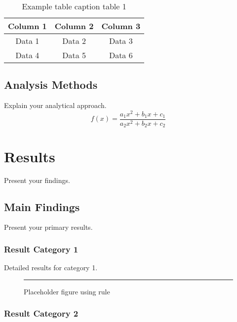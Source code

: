 \begin{table}[ht]
    \centering
    \begin{tabular}{|c|c|c|}
        \hline
        Column 1 & Column 2 & Column 3 \\
        \hline
        Data 1 & Data 2 & Data 3 \\
        Data 4 & Data 5 & Data 6 \\
        \hline
    \end{tabular}
    \caption{Example table caption table 1}
    \label{tab:example1}
\end{table}

\section{Analysis Methods}

Explain your analytical approach.
\begin{equation}
    f(x) = \frac{a_1 x^2 + b_1 x + c_1}{a_2 x^2 + b_2 x + c_2}
\end{equation}

\chapter{Results}

Present your findings. 

\section{Main Findings}

Present your primary results.

\subsection{Result Category 1}

Detailed results for category 1. 

\begin{figure}[ht]
    \centering
    \label{fig:example1}
    \rule{0.8\textwidth}{2in}
    \caption{Placeholder figure using rule}
\end{figure}

\subsection{Result Category 2}

